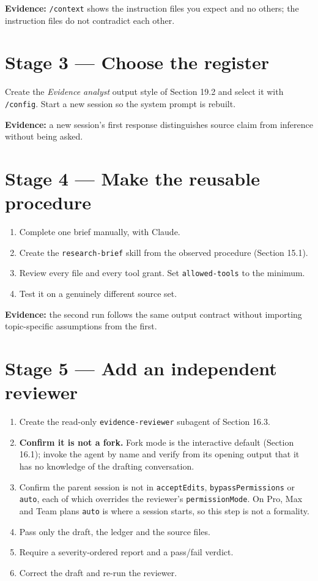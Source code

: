 \documentclass[11pt,a4paper,twoside,openany]{book}
\begin{document}
\textbf{Evidence:} \texttt{/\allowbreak{}context} shows the instruction files you expect and no others; the instruction files do not contradict each other.


\FloatBarrier
\setcounter{section}{3}
\section{Stage 3 — Choose the register}

Create the \emph{Evidence analyst} output style of Section 19.2 and select it with \texttt{/\allowbreak{}config}. Start a new session so the system prompt is rebuilt.


\textbf{Evidence:} a new session's first response distinguishes source claim from inference without being asked.


\FloatBarrier
\setcounter{section}{4}
\section{Stage 4 — Make the reusable procedure}

\begin{enumerate}
\item Complete one brief manually, with Claude.
\item Create the \texttt{research-\allowbreak{}brief} skill from the observed procedure (Section 15.1).
\item Review every file and every tool grant. Set \texttt{allowed-\allowbreak{}tools} to the minimum.
\item Test it on a genuinely different source set.
\end{enumerate}

\textbf{Evidence:} the second run follows the same output contract without importing topic-specific assumptions from the first.


\FloatBarrier
\setcounter{section}{5}
\section{Stage 5 — Add an independent reviewer}

\begin{enumerate}
\item Create the read-only \texttt{evidence-\allowbreak{}reviewer} subagent of Section 16.3.
\item \textbf{Confirm it is not a fork.} Fork mode is the interactive default (Section 16.1); invoke the agent by name and verify from its opening output that it has no knowledge of the drafting conversation.
\item Confirm the parent session is not in \texttt{accept\allowbreak{}Edits}, \texttt{bypass\allowbreak{}Permissions} or \texttt{auto}, each of which overrides the reviewer's \texttt{permission\allowbreak{}Mode}. On Pro, Max and Team plans \texttt{auto} is where a session starts, so this step is not a formality.
\item Pass only the draft, the ledger and the source files.
\item Require a severity-ordered report and a pass/fail verdict.
\item Correct the draft and re-run the reviewer.
\end{enumerate}
\end{document}
